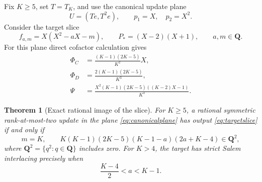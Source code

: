 \documentclass[11pt,reqno]{amsart}
\newtheorem{theorem}{Theorem}[section]
\theoremstyle{definition}
\theoremstyle{remark}
\newcommand{\Q}{\mathbf Q}
\begin{document}
Fix $K\geq5$, set $T=T_K$, and use the canonical update plane
\begin{equation}\label{eq:canonicalplane}
 U=(Te,T^2e),\qquad p_1=X,\quad p_2=X^2.
\end{equation}
Consider the target slice
\begin{equation}\label{eq:targetslice}
 f_{a,m}=X(X^2-aX-m),\qquad P_*=(X-2)(X+1),\qquad a,m\in\Q.
\end{equation}
For this plane direct cofactor calculation gives
\begin{align}
 \Phi_C&=\frac{(K-1)(2K-5)}{K^2}X,\label{eq:PhiCexplicit}\\
 \Phi_D&=\frac{2(K-1)(2K-5)}{K^3},\label{eq:PhiDexplicit}\\
 \Psi&=\frac{X^2(K-1)(2K-5)((K-2)X-1)}{K^3}.
 \label{eq:Psiexplicit}
\end{align}

\begin{theorem}[Exact rational image of the slice]\label{thm:slice}
For $K\geq5$, a rational symmetric rank-at-most-two update in the plane
\eqref{eq:canonicalplane} has output \eqref{eq:targetslice} if and only if
\begin{equation}\label{eq:slicecriterion}
 m=K,\qquad
 K(K-1)(2K-5)(K-1-a)(2a+K-4)\in\Q^2,
\end{equation}
where $\Q^2=\{q^2:q\in\Q\}$ includes zero.
For $K>4$, the target has strict Salem interlacing precisely when
\begin{equation}\label{eq:salemchamber}
 \frac{K-4}{2}<a<K-1.
\end{equation}
\end{theorem}
\end{document}
